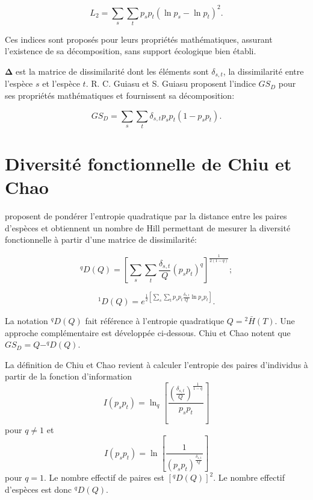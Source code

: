 \documentclass[
  11pt,
  french,
  a4paper,
  extrafontsizes,onecolumn,openright
  ]{memoir}
\begin{document}
\begin{equation}
  \label{eq:L2}
  L_2=\sum_{s}{\sum_{t}{p_{s}p_{t}{\left(\ln{p_{s}}-\ln{p_{t}}\right)}^2}}.
\end{equation}

Ces indices sont proposés pour leurs propriétés mathématiques, assurant l'existence de sa décomposition, sans support écologique bien établi.

\(\mathbf{\Delta}\) est la matrice de dissimilarité dont les éléments sont \(\delta_{s,t}\), la dissimilarité entre l'espèce \(s\) et l'espèce \(t\).
R. C. Guiasu et S. Guiasu \autocite*{Guiasu2011,Guiasu2012} proposent l'indice \(\mathit{{GS}_{D}}\) pour ses propriétés mathématiques et fournissent sa décomposition:

\begin{equation}
  \label{eq:Guiasu}
  \mathit{{GS}_{D}}=\sum_{s}{\sum_{t}{\delta_{s,t}p_{s}}}p_{t}\left(1-p_{s}p_{t}\right).
\end{equation}

\hypertarget{diversituxe9-fonctionnelle-de-chiu-et-chao}{%
\section{Diversité fonctionnelle de Chiu et Chao}\label{diversituxe9-fonctionnelle-de-chiu-et-chao}}

\textcite{Chiu2014b} proposent de pondérer l'entropie quadratique par la distance entre les paires d'espèces et obtiennent un nombre de Hill permettant de mesurer la diversité fonctionnelle à partir d'une matrice de dissimilarité:

\begin{equation}
  \label{eq:Chiu2014bDq}
  ^{q}\!D\left(Q\right)
  = \left[\sum_s{\sum_t{\frac{\delta_{s,t}}{Q}\left(p_s p_t\right)^q}}\right]^\frac{1}{2\left(1-q\right)};
\end{equation}

\begin{equation}
  \label{eq:Chiu2014bD1}
  ^{1}\!D\left(Q\right)
  = e^{\frac{1}{2}\left[\sum_s{\sum_t{p_s p_t\frac{\delta_{s,t}}{Q}\ln{p_s p_t}}}\right]}.
\end{equation}

La notation \(^{q}\!D(Q)\) fait référence à l'entropie quadratique \(Q = {^{2}\!\bar{H}}(T)\).
Une approche complémentaire est développée ci-dessous.
Chiu et Chao notent que \(\mathit{{GS}_{D}} = Q - ^{q}\!D(Q)\).

La définition de Chiu et Chao revient à calculer l'entropie des paires d'individus à partir de la fonction d'information
\[I(p_s p_t) = \ln_q[\frac{(\frac{\delta_{s,t}}{Q})^{\frac{1}{1-q}}}{p_s p_t}]\]
pour \(q \ne 1\) et
\[I(p_s p_t) = \ln[\frac{1}{(p_s p_t)^{\frac{\delta_{s,t}}{Q}}}]\]
pour \(q=1\).
Le nombre effectif de paires est \([^{q}\!D(Q)]^2\). Le nombre effectif d'espèces est donc \(^{q}\!D(Q)\).
\end{document}
